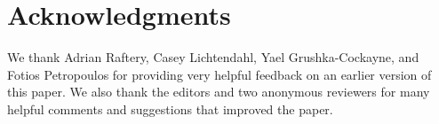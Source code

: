 \documentclass[a4paper,11pt]{article}
\begin{document}
\section*{Acknowledgments}

We thank Adrian Raftery, Casey Lichtendahl, Yael Grushka-Cockayne, and Fotios Petropoulos for providing very helpful feedback on an earlier version of this paper. We also thank the editors and two anonymous reviewers for many helpful comments and suggestions that improved the paper.

\newpage
\printbibliography
\end{document}
